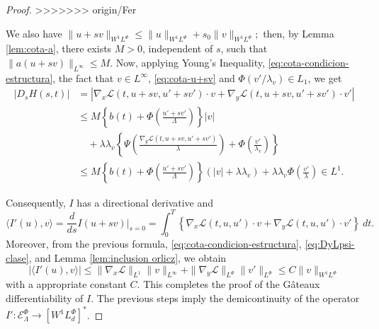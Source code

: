 \documentclass[twoside]{article}
\theoremstyle{remark}
\newcommand{\orlnor}{\|_{L^{\Phi}}}
\newcommand{\linf}{\|_{L^{\infty}}}
\newcommand{\lphi}{L^{\Phi}}
\newcommand{\lpsi}{L^{\Psi}}
\newcommand{\wphi}{W^{1}\lphi}
\newcommand{\sobnor}{\|_{W^{1}\lphi}}
\newcommand{\domi}{\mathcal{E}^{\Phi}}
\renewcommand{\leq}{\leqslant}
\begin{document}
\begin{proof}
>>>>>>> origin/Fer

We also have
$
\|u+sv\sobnor\leq \|u\sobnor+s_0\|v\sobnor;
$
then, by Lemma \ref{lem:cota-a}, there exists $M>0$, independent of $s$, such that
$\|a(u+sv)\linf\leq M$. Now, applying Young's Inequality,  \eqref{eq:cota-condicion-estructura},
the fact that $v \in L^{\infty}$, \eqref{eq:cota-u+sv} and $\Phi(v'/\lambda_v)\in L_1$, 
we get
\begin{equation}\label{ctg}
\begin{split}
|D_s H(s,t)|&=\left| \nabla_x\mathcal{L}(t,u+sv,u'+sv')\cdot v +
  \nabla_y\mathcal{L}(t, u+s v, u'+sv')\cdot v'\right| \\
  & \leq M \left\{ b(t)+ \Phi\left(\frac{u'+sv'}{\Lambda}\right)\right\}|v|\\
 &\quad+ \lambda\lambda_v\left\{\Psi\left(\frac{\nabla_y\mathcal{L}(t,u+sv,u'+sv')}{\lambda}\right)+\Phi\left(\frac{v'}{\lambda_v}\right) \right\}
\\
 &\leq 
 M \left\{ b(t)+ \Phi\left(\frac{u'+sv'}{\Lambda}\right)\right\} (|v|+\lambda\lambda_v) +\lambda\lambda_v \Phi\left(\frac{v'}{\lambda}\right)
 \in L^1.
\end{split}
\end{equation}

Consequently, $I$ has a directional derivative and
\[
\langle I'(u),v \rangle=\frac{d}{ds}I(u+s v)\big|_{s=0}=\int_0^T  
\left\{\nabla_x\mathcal{L}(t,u,u')\cdot v+ \nabla_y\mathcal{L}(t,u,u')\cdot v'\right\} \ dt.
\]
Moreover, from the previous formula, \eqref{eq:cota-condicion-estructura},  \eqref{eq:DyLpsi-clase}, and
Lemma \ref{lem:inclusion orlicz}, we obtain
\[
|\langle I'(u),v \rangle| \leq \|\nabla_x\mathcal{L}\|_{L^1} \| v\linf + 
\|\nabla_y\mathcal{L}\|_{\lpsi} \|v'\orlnor \leq C \|v\sobnor
\]
with a appropriate constant $C$.
This completes the proof of the G\^ateaux differentiability of $I$. 
The previous steps imply the demicontinuity of the operator $I':\domi_{\Lambda}  \to \left[\wphi_d
\right]^* $.



\end{proof}
\end{document}
